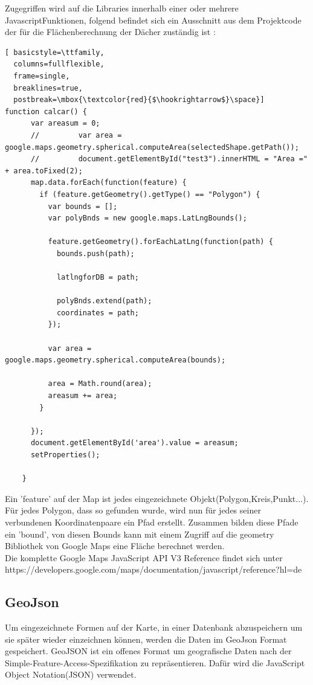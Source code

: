 \documentclass[12pt,a4paper]{article}
\begin{document}
Zugegriffen wird auf die Libraries innerhalb einer oder mehrere JavascriptFunktionen, folgend befindet sich ein Ausschnitt aus dem Projektcode der für die Flächenberechnung der Dächer zuständig ist :
\begin{lstlisting}[ basicstyle=\ttfamily,
  columns=fullflexible,
  frame=single,
  breaklines=true,
  postbreak=\mbox{\textcolor{red}{$\hookrightarrow$}\space}]
function calcar() {
      var areasum = 0;
      //         var area = google.maps.geometry.spherical.computeArea(selectedShape.getPath());
      //         document.getElementById("test3").innerHTML = "Area =" + area.toFixed(2);
      map.data.forEach(function(feature) {
        if (feature.getGeometry().getType() == "Polygon") {
          var bounds = [];
          var polyBnds = new google.maps.LatLngBounds();

          feature.getGeometry().forEachLatLng(function(path) {
            bounds.push(path);

            latlngforDB = path;

            polyBnds.extend(path);
            coordinates = path;
          });
          
          var area = google.maps.geometry.spherical.computeArea(bounds);
 
          area = Math.round(area);
          areasum += area;
        }

      });
      document.getElementById('area').value = areasum;
      setProperties();

    }
\end{lstlisting}
 Ein 'feature' auf der Map ist jedes eingezeichnete Objekt(Polygon,Kreis,Punkt...). Für jedes Polygon, dass so gefunden wurde, wird nun für jedes seiner verbundenen Koordinatenpaare ein Pfad erstellt. Zusammen bilden diese Pfade ein 'bound', von diesen Bounds kann mit einem Zugriff auf die geometry Bibliothek von Google Maps eine Fläche berechnet werden.\\
 
Die komplette Google Maps JavaScript API V3 Reference findet sich unter
https://developers.google.com/maps/documentation/javascript/reference?hl=de \\

\subsection{GeoJson}
Um eingezeichnete Formen auf der Karte, in einer Datenbank abzuspeichern um sie später wieder einzeichnen können, werden die Daten im GeoJson Format gespeichert. GeoJSON ist ein offenes Format um geografische Daten nach der Simple-Feature-Access-Spezifikation zu repräsentieren. Dafür wird die JavaScript Object Notation(JSON) verwendet.\\
\end{document}
